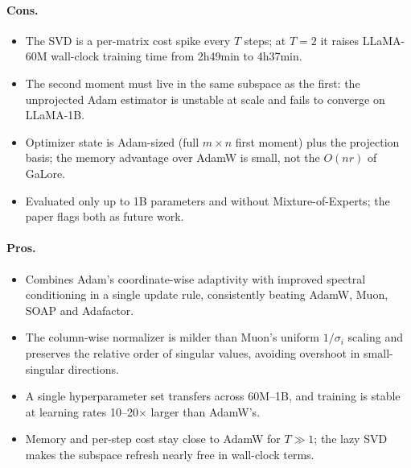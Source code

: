 \paragraph{Cons.}
\begin{itemize}[leftmargin=*]
\item The SVD is a per-matrix cost spike every $T$ steps; at $T=2$ it raises LLaMA-60M
  wall-clock training time from 2h49min to 4h37min.
\item The second moment must live in the same subspace as the first: the unprojected
  Adam estimator is unstable at scale and fails to converge on LLaMA-1B.
\item Optimizer state is Adam-sized (full $m\times n$ first moment) plus the projection
  basis; the memory advantage over AdamW is small, not the $O(nr)$ of GaLore.
\item Evaluated only up to 1B parameters and without Mixture-of-Experts; the paper flags
  both as future work.
\end{itemize}

\paragraph{Pros.}
\begin{itemize}[leftmargin=*]
\item Combines Adam's coordinate-wise adaptivity with improved spectral conditioning in
  a single update rule, consistently beating AdamW, Muon, SOAP and Adafactor.
\item The column-wise normalizer is milder than Muon's uniform $1/\sigma_i$ scaling and
  preserves the relative order of singular values, avoiding overshoot in small-singular
  directions.
\item A single hyperparameter set transfers across 60M--1B, and training is stable at
  learning rates 10--20$\times$ larger than AdamW's.
\item Memory and per-step cost stay close to AdamW for $T \gg 1$; the lazy SVD makes the
  subspace refresh nearly free in wall-clock terms.
\end{itemize}

